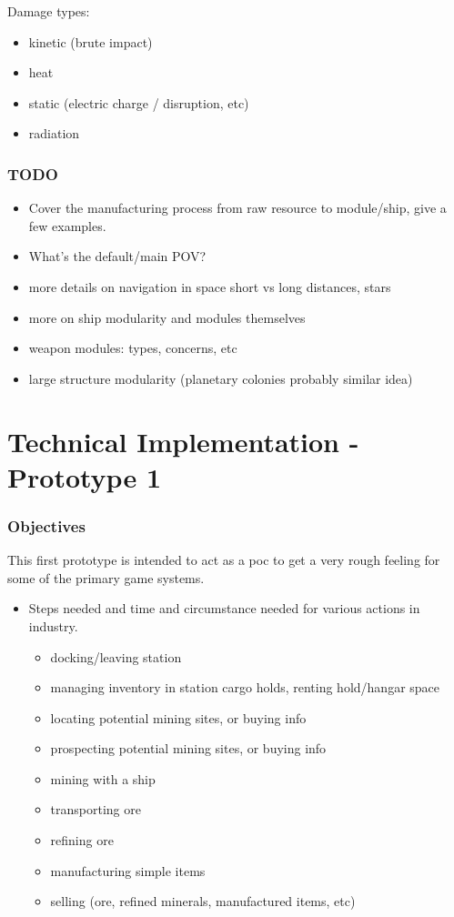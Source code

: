 \documentclass[a4paper,10pt]{article}
\begin{document}
Damage types:
\begin{itemize}
    \item kinetic (brute impact)
    \item heat
    \item static (electric charge / disruption, etc)
    \item radiation
\end{itemize}


\section{TODO}
\begin{itemize}
    \item Cover the manufacturing process from raw resource to module/ship,
    give a few examples.
    \item What's the default/main POV?
    \item more details on navigation in space short vs long distances, stars
    \item more on ship modularity and modules themselves
    \item weapon modules: types, concerns, etc
    \item large structure modularity (planetary colonies probably similar idea)
\end{itemize}

\part{Technical Implementation - Prototype 1}

\section{Objectives}
This first prototype is intended to act as a poc to get a very rough feeling
for some of the primary game systems.

\begin{itemize}
    \item Steps needed and time and circumstance needed for various actions in
        industry.
    \begin{itemize}
        \item docking/leaving station
        \item managing inventory in station cargo holds, renting hold/hangar space
        \item locating potential mining sites, or buying info
        \item prospecting potential mining sites, or buying info
        \item mining with a ship
        \item transporting ore
        \item refining ore
        \item manufacturing simple items
        \item selling (ore, refined minerals, manufactured items, etc)
    \end{itemize}
\end{itemize}
\end{document}
